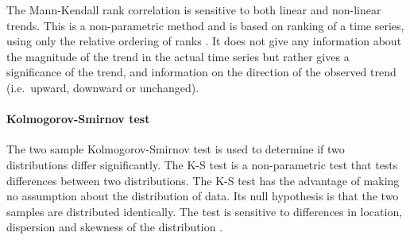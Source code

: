 The Mann-Kendall rank correlation \citep{mann1945-245,kendall1975-202} is
sensitive to both linear and non-linear trends. This is a non-parametric method
and is based on ranking of a time series, using only the relative ordering of
ranks \citep{press1996-933}. It does not give any information about the
magnitude of the trend in the actual time series but rather gives a significance
of the trend, and information on the direction of the observed trend (i.e.\
upward, downward or unchanged).

%
%
%
%
%

\paragraph{Kolmogorov-Smirnov test}
\label{sec:KolmogorovSmirnovTest}
The two sample Kolmogorov-Smirnov test is used to determine if two distributions
differ significantly. The K-S test is a non-parametric test that tests
differences between two distributions. The K-S test has the advantage of making
no assumption about the distribution of data. Its null hypothesis is that the
two samples are distributed identically. The test is sensitive to differences in
location, dispersion and skewness of the distribution \citep{sokal1995-887}.


